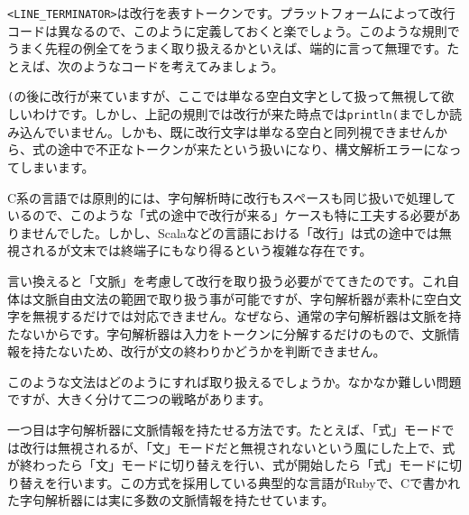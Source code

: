 \texttt{\textless{}LINE\_TERMINATOR\textgreater{}}は改行を表すトークンです。プラットフォームによって改行コードは異なるので、このように定義しておくと楽でしょう。このような規則でうまく先程の例全てをうまく取り扱えるかといえば、端的に言って無理です。たとえば、次のようなコードを考えてみましょう。

\begin{Shaded}
\begin{Highlighting}[]
\NormalTok{(}
  \NormalTok{)}
\end{Highlighting}
\end{Shaded}

\texttt{(}の後に改行が来ていますが、ここでは単なる空白文字として扱って無視して欲しいわけです。しかし、上記の規則では改行が来た時点では\texttt{println(}までしか読み込んでいません。しかも、既に改行文字は単なる空白と同列視できませんから、式の途中で不正なトークンが来たという扱いになり、構文解析エラーになってしまいます。

C系の言語では原則的には、字句解析時に改行もスペースも同じ扱いで処理しているので、このような「式の途中で改行が来る」ケースも特に工夫する必要がありませんでした。しかし、Scalaなどの言語における「改行」は式の途中では無視されるが文末では終端子にもなり得るという複雑な存在です。

言い換えると「文脈」を考慮して改行を取り扱う必要がでてきたのです。これ自体は文脈自由文法の範囲で取り扱う事が可能ですが、字句解析器が素朴に空白文字を無視するだけでは対応できません。なぜなら、通常の字句解析器は文脈を持たないからです。字句解析器は入力をトークンに分解するだけのもので、文脈情報を持たないため、改行が文の終わりかどうかを判断できません。

このような文法はどのようにすれば取り扱えるでしょうか。なかなか難しい問題ですが、大きく分けて二つの戦略があります。

一つ目は字句解析器に文脈情報を持たせる方法です。たとえば、「式」モードでは改行は無視されるが、「文」モードだと無視されないという風にした上で、式が終わったら「文」モードに切り替えを行い、式が開始したら「式」モードに切り替えを行います。この方式を採用している典型的な言語がRubyで、Cで書かれた字句解析器には実に多数の文脈情報を持たせています。

